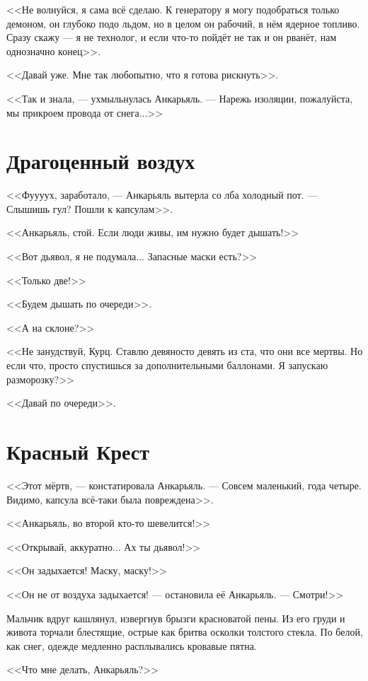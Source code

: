 \documentclass[a4paper,10pt,fleqn]{book}\usepackage{polyglossia}\setdefaultlanguage{english}\setotherlanguage{russian}\defaultfontfeatures{Ligatures=TeX,Mapping=tex-text}\usepackage{xcolor}\definecolor{lightgray}{HTML}{bbbbbb}\color{lightgray}\newcommand{\ml}[3]{\textcolor{black}{#3}}
\begin{document}
<<Не волнуйся, я сама всё сделаю.
К генератору я могу подобраться только демоном, он глубоко подо льдом, но в целом он рабочий, в нём ядерное топливо.
Сразу скажу --- я не технолог, и если что-то пойдёт не так и он рванёт, нам однозначно конец>>.

<<Давай уже.
Мне так любопытно, что я готова рискнуть>>.

<<Так и знала, --- ухмыльнулась Анкарьяль.
--- Нарежь изоляции, пожалуйста, мы прикроем провода от снега...>>

\section{Драгоценный воздух}

<<Фуууух, заработало, --- Анкарьяль вытерла со лба холодный пот.
--- Слышишь гул?
Пошли к капсулам>>.

<<Анкарьяль, стой.
Если люди живы, им нужно будет дышать!>>

<<Вот дьявол, я не подумала...
Запасные маски есть?>>

<<Только две!>>

<<Будем дышать по очереди>>.

<<А на склоне?>>

<<Не занудствуй, Курц.
Ставлю девяносто девять из ста, что они все мертвы.
Но если что, просто спустишься за дополнительными баллонами.
Я запускаю разморозку?>>

<<Давай по очереди>>.

\section{Красный Крест}

<<Этот мёртв, --- констатировала Анкарьяль.
--- Совсем маленький, года четыре.
Видимо, капсула всё-таки была повреждена>>.

<<Анкарьяль, во второй кто-то шевелится!>>

<<Открывай, аккуратно... Ах ты дьявол!>>

<<Он задыхается!
Маску, маску!>>

<<Он не от воздуха задыхается! --- остановила её Анкарьяль.
--- Смотри!>>

Мальчик вдруг кашлянул, извергнув брызги красноватой пены.
Из его груди и живота торчали блестящие, острые как бритва осколки толстого стекла.
По белой, как снег, одежде медленно расплывались кровавые пятна.

<<Что мне делать, Анкарьяль?>>
\end{document}
